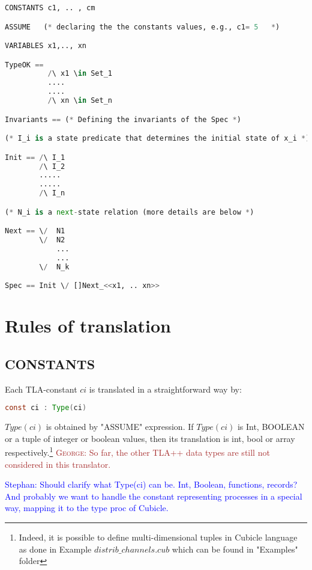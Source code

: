 \documentclass{article}
\theoremstyle{plain}
\numberwithin{equation}{section}
\newcommand{\george}[1]{\textcolor{brown}{\textsc{George: } {\sf #1}}}
\newcommand{\ste}[1]{\par\noindent\textcolor{blue}{\small Stephan: #1}}
\begin{document}
\begin{lstlisting}[language=Python]
CONSTANTS c1, .. , cm

ASSUME   (* declaring the the constants values, e.g., c1= 5   *)  

VARIABLES x1,.., xn

TypeOK == 
          /\ x1 \in Set_1
          ....
          ....
          /\ xn \in Set_n

Invariants == (* Defining the invariants of the Spec *)           

(* I_i is a state predicate that determines the initial state of x_i *)

Init == /\ I_1    
        /\ I_2 
        .....
        .....
        /\ I_n 

(* N_i is a next-state relation (more details are below *)

Next == \/  N1 
        \/  N2 
            ...
            ...
        \/  N_k 

Spec == Init \/ []Next_<<x1, .. xn>>        
\end{lstlisting}
 

\section*{Rules of translation}

 
\subsection{CONSTANTS} Each TLA-constant $ci$ is  translated in a straightforward  way  by:  
   
\begin{lstlisting}[language=Java]
const ci : Type(ci) 
\end{lstlisting}

\emph{$Type(ci)$} is obtained by "ASSUME" expression. If \emph{$Type(ci)$} is Int, BOOLEAN or a tuple of integer or boolean values, then its translation is int,  bool or array respectively.\footnote{Indeed, it is possible to define multi-dimensional tuples in Cubicle language as done in Example \emph{$distrib\_channels.cub$} which can be found in "Examples" folder} \george{So far, the other TLA++ data types are still not considered in this translator.  }  

\ste{Should clarify what Type(ci) can be. Int, Boolean, functions, records? And
  probably we want to handle the constant representing processes in a special
  way, mapping it to the type proc of Cubicle.}
\end{document}

